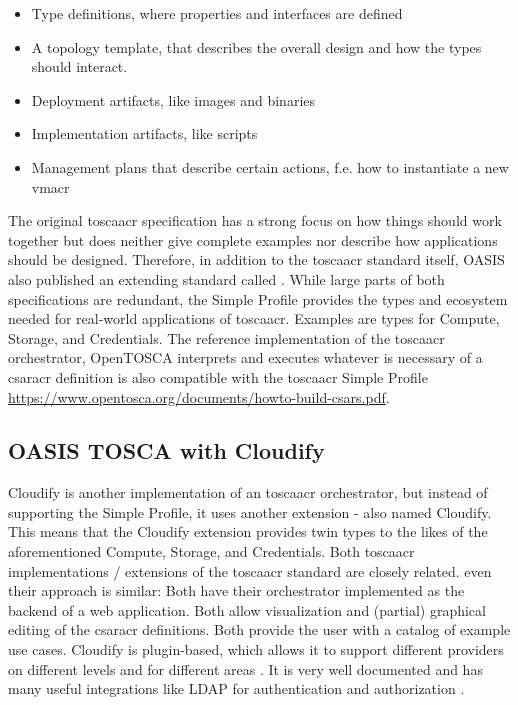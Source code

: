 \begin{itemize}
  \item Type definitions, where properties and interfaces are defined
  \item A topology template, that describes the overall design and how the types should interact.
  \item Deployment artifacts, like images and binaries
  \item Implementation artifacts, like scripts
  \item Management plans that describe certain actions, f.e. how to instantiate a new \gls{vmacr}
\end{itemize}
The original \gls{toscaacr} specification has a strong focus on how things should work together but does neither give complete examples nor describe how applications should be designed. Therefore, in addition to the \gls{toscaacr} standard itself, OASIS also published an extending standard called  \cite{tosca_simple_profile_v1_3}. While large parts of both specifications are redundant, the Simple Profile provides the types and ecosystem needed for real-world applications of \gls{toscaacr}. Examples are types for Compute, Storage, and Credentials. The reference implementation of the \gls{toscaacr} orchestrator, OpenTOSCA interprets and executes whatever is necessary of a \gls{csaracr} definition is also compatible with the \gls{toscaacr} Simple Profile \url{https://www.opentosca.org/documents/howto-build-csars.pdf}.

\subsection{OASIS TOSCA with Cloudify}
Cloudify is another implementation of an \gls{toscaacr} orchestrator, but instead of supporting the Simple Profile, it uses another extension - also named Cloudify. This means that the Cloudify extension provides twin types to the likes of the aforementioned Compute, Storage, and Credentials.
Both \gls{toscaacr} implementations / extensions of the \gls{toscaacr} standard are closely related. even their approach is similar: Both have their orchestrator implemented as the backend of a web application. Both allow visualization and (partial) graphical editing of the \gls{csaracr} definitions. Both provide the user with a catalog of example use cases.
\newline
Cloudify is plugin-based, which allows it to support different providers on different levels and for different areas \cite{cloudify_plugins}. It is very well documented and has many useful integrations like LDAP for authentication and authorization \cite{cloudify_ldap_integration}.

